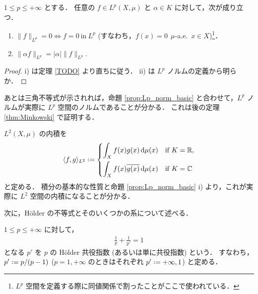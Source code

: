 \begin{proposition}\label{prop:Lp_norm_basic}
    $1\le p\le+\infty$ とする．
    任意の $f\in L^p(X,\mu)$ と $\alpha\in K$ に対して，次が成り立つ．
    \begin{enumerate}
        \item $\|f\|_{L^p}=0\iff f=0\ \text{in}\ L^p$ (すなわち，$f(x)=0\ \ \mu$-a.e.\ $x\in X$)\footnote{
            $L^p$ 空間を定義する際に同値関係で割ったことがここで使われている．
        }．
        \item $\|\alpha f\|_{L^p}=|\alpha|\|f\|_{L^p}.$
    \end{enumerate}
\end{proposition}

\begin{proof}
    \textrm{i)} は定理 \ref{TODO} より直ちに従う．
    \textrm{ii)} は $L^p$ ノルムの定義から明らか．
\end{proof}

あとは三角不等式が示されれば，命題 \ref{prop:Lp_norm_basic} と合わせて，$L^p$ ノルムが実際に $L^p$ 空間のノルムであることが分かる．
これは後の定理 \ref{thm:Minkowski} で証明する．

\begin{definition}
    $L^2(X,\mu)$ の内積を
    \begin{align*}
        \langle f,g\rangle_{L^2}\defeq\begin{dcases}
            \int_Xf(x)g(x)\,\drm\mu(x)&\text{if $K=\Rbb$},\\
            \int_Xf(x)\overline{g(x)}\,\drm\mu(x)&\text{if $K=\Cbb$}
        \end{dcases}
    \end{align*}
    と定める．
    積分の基本的な性質と命題 \ref{prop:Lp_norm_basic} \textrm{i)} より，これが実際に $L^2$ 空間の内積になることが分かる．
\end{definition}

次に，H\"older の不等式とそのいくつかの系について述べる．

\begin{definition}
    $1\le p\le+\infty$ に対して，
    \begin{align*}
        \frac{1}{p}+\frac{1}{p'}=1
    \end{align*}
    となる $p'$ を $p$ の H\"older 共役指数 (あるいは単に共役指数) という．
    すなわち，$p'\defeq p/(p-1)$ ($p=1,+\infty$ のときはそれぞれ $p'\defeq+\infty,1$) と定める．
\end{definition}

